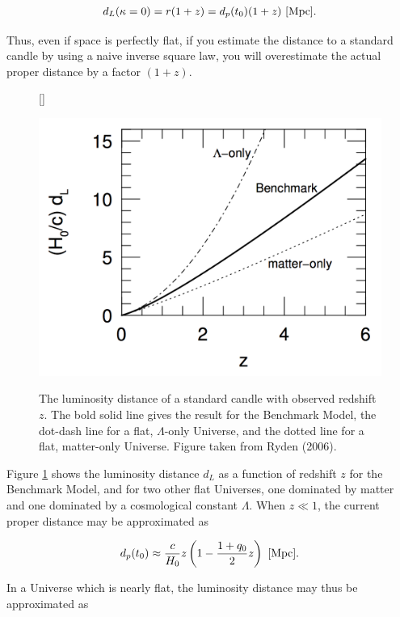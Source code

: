 \documentclass[a4paper,11pt]{article}
\begin{document}
\begin{align*}
    d_L(\kappa=0) = r(1+z) = d_p(t_0)(1+z) ~ [{\rm Mpc}].
\end{align*}

{\noindent}Thus, even if space is perfectly flat, if you estimate the distance to a standard candle by using a naive inverse square law, you will overestimate the actual proper distance by a factor $(1 + z)$.

\begin{figure}[h]
    [\FBwidth]
    {\caption{\footnotesize{The luminosity distance of a standard candle with observed redshift $z$. The bold solid line gives the result for the Benchmark Model, the dot-dash line for a flat, $\Lambda$-only Universe, and the dotted line for a flat, matter-only Universe. Figure taken from Ryden (2006).}}
    \label{fig:luminositydistance}}
    {\includegraphics[width=12cm]{figures/LuminosityDistance.png}}
\end{figure}

{\noindent}Figure \ref{fig:luminositydistance} shows the luminosity distance $d_L$ as a function of redshift $z$ for the Benchmark Model, and for two other flat Universes, one dominated by matter and one dominated by a cosmological constant $\Lambda$. When $z \ll 1$, the current proper distance may be approximated as

\begin{align*}
    d_p(t_0) \approx \frac{c}{H_0}z \left(1-\frac{1+q_0}{2}z\right) ~ [{\rm Mpc}].
\end{align*}

{\noindent}In a Universe which is nearly flat, the luminosity distance may thus be approximated as
\end{document}
